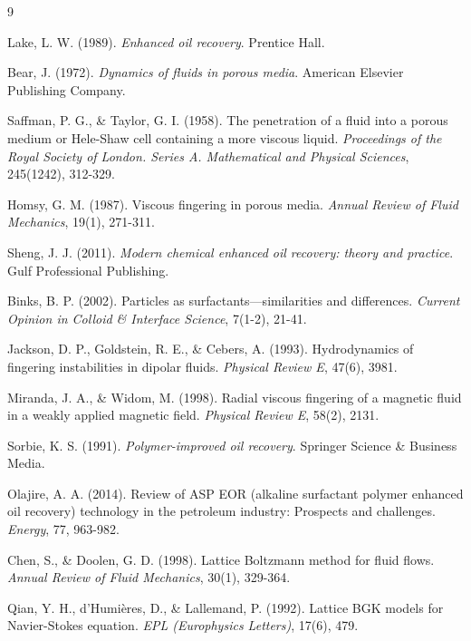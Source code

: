 \begin{thebibliography}{9}

Lake, L. W. (1989). \emph{Enhanced oil recovery}. Prentice Hall.

Bear, J. (1972). \emph{Dynamics of fluids in porous media}. American Elsevier Publishing Company.

Saffman, P. G., \& Taylor, G. I. (1958). The penetration of a fluid into a porous medium or Hele-Shaw cell containing a more viscous liquid. \emph{Proceedings of the Royal Society of London. Series A. Mathematical and Physical Sciences}, 245(1242), 312-329.

Homsy, G. M. (1987). Viscous fingering in porous media. \emph{Annual Review of Fluid Mechanics}, 19(1), 271-311.

Sheng, J. J. (2011). \emph{Modern chemical enhanced oil recovery: theory and practice}. Gulf Professional Publishing.

Binks, B. P. (2002). Particles as surfactants—similarities and differences. \emph{Current Opinion in Colloid \& Interface Science}, 7(1-2), 21-41.

Jackson, D. P., Goldstein, R. E., \& Cebers, A. (1993). Hydrodynamics of fingering instabilities in dipolar fluids. \emph{Physical Review E}, 47(6), 3981.

Miranda, J. A., \& Widom, M. (1998). Radial viscous fingering of a magnetic fluid in a weakly applied magnetic field. \emph{Physical Review E}, 58(2), 2131.

Sorbie, K. S. (1991). \emph{Polymer-improved oil recovery}. Springer Science \& Business Media.

Olajire, A. A. (2014). Review of ASP EOR (alkaline surfactant polymer enhanced oil recovery) technology in the petroleum industry: Prospects and challenges. \emph{Energy}, 77, 963-982.


Chen, S., \& Doolen, G. D. (1998). Lattice Boltzmann method for fluid flows. \emph{Annual Review of Fluid Mechanics}, 30(1), 329-364.

Qian, Y. H., d'Humières, D., \& Lallemand, P. (1992). Lattice BGK models for Navier-Stokes equation. \emph{EPL (Europhysics Letters)}, 17(6), 479.


\end{thebibliography}
